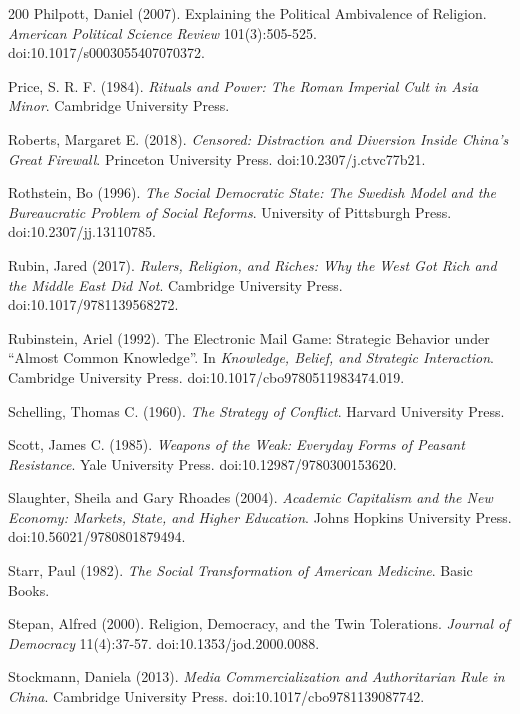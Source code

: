 \documentclass[11pt,letterpaper]{article}
\theoremstyle{definition}
\theoremstyle{remark}
\begin{document}
\begin{thebibliography}{200}
Philpott, Daniel (2007). Explaining the Political Ambivalence of Religion. \emph{American Political Science Review} 101(3):505-525. doi:10.1017/s0003055407070372.

Price, S. R. F. (1984). \emph{Rituals and Power: The Roman Imperial Cult in Asia Minor}. Cambridge University Press.

Roberts, Margaret E. (2018). \emph{Censored: Distraction and Diversion Inside China's Great Firewall}. Princeton University Press. doi:10.2307/j.ctvc77b21.

Rothstein, Bo (1996). \emph{The Social Democratic State: The Swedish Model and the Bureaucratic Problem of Social Reforms}. University of Pittsburgh Press. doi:10.2307/jj.13110785.

Rubin, Jared (2017). \emph{Rulers, Religion, and Riches: Why the West Got Rich and the Middle East Did Not}. Cambridge University Press. doi:10.1017/9781139568272.

Rubinstein, Ariel (1992). The Electronic Mail Game: Strategic Behavior under ``Almost Common Knowledge''. In \emph{Knowledge, Belief, and Strategic Interaction}. Cambridge University Press. doi:10.1017/cbo9780511983474.019.

Schelling, Thomas C. (1960). \emph{The Strategy of Conflict}. Harvard University Press.

Scott, James C. (1985). \emph{Weapons of the Weak: Everyday Forms of Peasant Resistance}. Yale University Press. doi:10.12987/9780300153620.

Slaughter, Sheila and Gary Rhoades (2004). \emph{Academic Capitalism and the New Economy: Markets, State, and Higher Education}. Johns Hopkins University Press. doi:10.56021/9780801879494.

Starr, Paul (1982). \emph{The Social Transformation of American Medicine}. Basic Books.

Stepan, Alfred (2000). Religion, Democracy, and the Twin Tolerations. \emph{Journal of Democracy} 11(4):37-57. doi:10.1353/jod.2000.0088.

Stockmann, Daniela (2013). \emph{Media Commercialization and Authoritarian Rule in China}. Cambridge University Press. doi:10.1017/cbo9781139087742.


\end{thebibliography}
\end{document}
